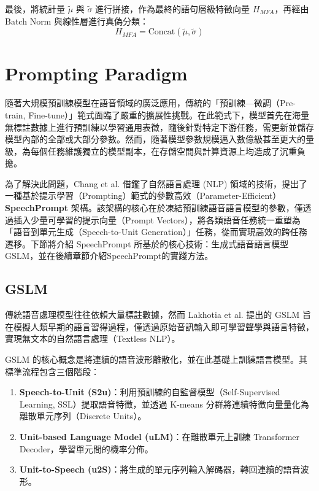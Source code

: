 最後，將統計量 $\tilde{\mu}$ 與 $\tilde{\sigma}$ 進行拼接，作為最終的語句層級特徵向量 $H_{MFA}$，再經由 Batch Norm 與線性層進行真偽分類：
\begin{equation}
H_{MFA} = \text{Concat}(\tilde{\mu}, \tilde{\sigma})
\end{equation}


\section{Prompting Paradigm}

隨著大規模預訓練模型在語音領域的廣泛應用，傳統的「預訓練—微調（Pre-train, Fine-tune）」範式面臨了嚴重的擴展性挑戰。在此範式下，模型首先在海量無標註數據上進行預訓練以學習通用表徵，隨後針對特定下游任務，需更新並儲存模型內部的全部或大部分參數。然而，隨著模型參數規模邁入數億級甚至更大的量級，為每個任務維護獨立的模型副本，在存儲空間與計算資源上均造成了沉重負擔。

為了解決此問題，Chang et al. \cite{chang2023speechprompt} 借鑑了自然語言處理 (NLP) 領域的技術，提出了一種基於提示學習（Prompting）範式的參數高效（Parameter-Efficient）\textbf{SpeechPrompt} 架構。該架構的核心在於凍結預訓練語音語言模型的參數，僅透過插入少量可學習的提示向量（Prompt Vectors），將各類語音任務統一重塑為「語音到單元生成（Speech-to-Unit Generation）」任務，從而實現高效的跨任務遷移。下節將介紹 SpeechPrompt 所基於的核心技術：生成式語音語言模型 GSLM，並在後續章節介紹SpeechPrompt的實踐方法。

\subsection{GSLM}
傳統語音處理模型往往依賴大量標註數據，然而 Lakhotia et al. \cite{lakhotia2021generative} 提出的 GSLM 旨在模擬人類早期的語言習得過程，僅透過原始音訊輸入即可學習聲學與語言特徵，實現無文本的自然語言處理（Textless NLP）。

GSLM 的核心概念是將連續的語音波形離散化，並在此基礎上訓練語言模型。其標準流程包含三個階段：

\begin{enumerate}
    \item \textbf{Speech-to-Unit (S2u)}：利用預訓練的自監督模型（Self-Supervised Learning, SSL）提取語音特徵，並透過 K-means 分群將連續特徵向量量化為離散單元序列（Discrete Units）。
    \item \textbf{Unit-based Language Model (uLM)}：在離散單元上訓練 Transformer Decoder，學習單元間的機率分佈。
    \item \textbf{Unit-to-Speech (u2S)}：將生成的單元序列輸入解碼器，轉回連續的語音波形。
\end{enumerate}

